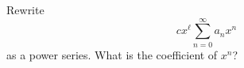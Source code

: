 Rewrite 
\[
cx^\ell \sum_{n = 0}^\infty a_n x^n
\] 
as a
power series.
What is the coefficient of $x^n$?
